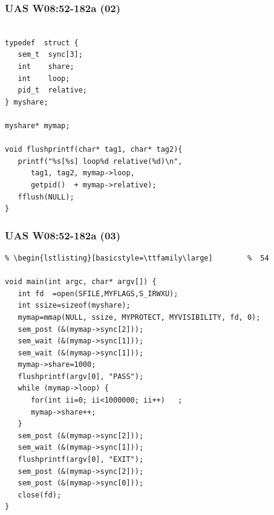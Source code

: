 \documentclass[xcolor=table, notheorems, hyperref={pdfpagelabels=false}]{beamer}
\begin{document}
\begin{frame}[fragile]
\frametitle{UAS W08:52-182a (02)}
\begin{lstlisting}[basicstyle=\ttfamily\large]        %  54

typedef  struct {
   sem_t  sync[3];
   int    share;
   int    loop;
   pid_t  relative;
} myshare;

myshare* mymap;

void flushprintf(char* tag1, char* tag2){
   printf("%s[%s] loop%d relative(%d)\n", 
      tag1, tag2, mymap->loop, 
      getpid()  + mymap->relative);
   fflush(NULL);
}

\end{lstlisting}
\end{frame}

\begin{frame}[fragile]
\frametitle{UAS W08:52-182a (03)}
\begin{lstlisting}[basicstyle=\ttfamily\footnotesize] %  72
% \begin{lstlisting}[basicstyle=\ttfamily\small]        %  65
% \begin{lstlisting}[basicstyle=\ttfamily\large]        %  54

void main(int argc, char* argv[]) {
   int fd  =open(SFILE,MYFLAGS,S_IRWXU);
   int ssize=sizeof(myshare);
   mymap=mmap(NULL, ssize, MYPROTECT, MYVISIBILITY, fd, 0);
   sem_post (&(mymap->sync[2]));
   sem_wait (&(mymap->sync[1]));
   sem_wait (&(mymap->sync[1]));
   mymap->share=1000;
   flushprintf(argv[0], "PASS");
   while (mymap->loop) {
      for(int ii=0; ii<1000000; ii++)   ;
      mymap->share++;
   }
   sem_post (&(mymap->sync[2]));
   sem_wait (&(mymap->sync[1]));
   flushprintf(argv[0], "EXIT");
   sem_post (&(mymap->sync[2]));
   sem_post (&(mymap->sync[0]));
   close(fd);
}

\end{lstlisting}
\end{frame}

\end{document}
